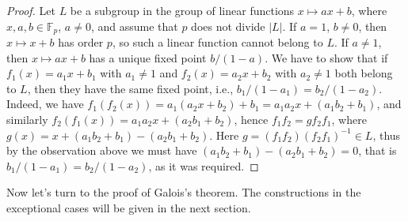 \documentclass[reqno,12pt]{amsart}
\theoremstyle{definition}
\begin{document}
\begin{proof}
Let $L$ be a subgroup in the group of linear functions $x\mapsto ax+b$, where
$x,a,b\in\mathbb{F}_p$, $a\ne 0$, and assume that $p$ does not divide $|L|$.
If $a=1$, $b\ne 0$, then $x\mapsto x+b$ has order $p$, so such a linear function
cannot belong to $L$. If $a\ne 1$, then $x\mapsto ax+b$ has a unique fixed point
$b/(1-a)$. We have to show that if $f_1(x)=a_1x+b_1$ with $a_1\ne 1$ and
$f_2(x)=a_2x+b_2$ with $a_2\ne 1$ both belong to $L$, then they have the same
fixed point, i.e., $b_1/(1-a_1)=b_2/(1-a_2)$. Indeed, we have
$f_1(f_2(x))=a_1(a_2x+b_2)+b_1=a_1a_2x+(a_1b_2+b_1)$, and similarly
$f_2(f_1(x))=a_1a_2x+(a_2b_1+b_2)$, hence $f_1f_2=gf_2f_1$, where
$g(x)=x+(a_1b_2+b_1)-(a_2b_1+b_2)$. Here $g=(f_1f_2)(f_2f_1)^{-1}\in L$, thus
by the observation above we must have $(a_1b_2+b_1)-(a_2b_1+b_2)=0$, that is
$b_1/(1-a_1)=b_2/(1-a_2)$, as it was required.
\end{proof}

Now let's turn to the proof of Galois's theorem. The constructions
in the exceptional cases will be given in the next section.
\end{document}
